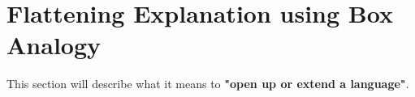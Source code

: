 \documentclass[thesis-solanki.tex]{subfiles}
\begin{document}

\clearpage

\section{Flattening Explanation using Box Analogy}

This section will describe what it means to \textbf{"open up or extend a language"}. 
\end{document}
